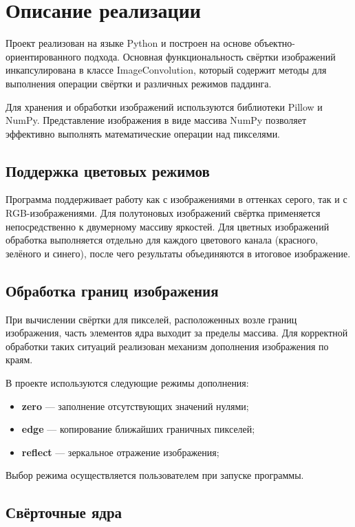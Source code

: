 \documentclass[a4paper]{article}
\begin{document}
\section{Описание реализации}

Проект реализован на языке Python и построен на основе объектно-ориентированного подхода. Основная функциональность свёртки изображений инкапсулирована в классе ImageConvolution, который содержит методы для выполнения операции свёртки и различных режимов паддинга.

Для хранения и обработки изображений используются библиотеки Pillow и NumPy. Представление изображения в виде массива NumPy позволяет эффективно выполнять математические операции над пикселями.

\subsection{Поддержка цветовых режимов}

Программа поддерживает работу как с изображениями в оттенках серого, так и с RGB-изображениями.
Для полутоновых изображений свёртка применяется непосредственно к двумерному массиву яркостей.
Для цветных изображений обработка выполняется отдельно для каждого цветового канала (красного, зелёного и синего), после чего результаты объединяются в итоговое изображение.

\subsection{Обработка границ изображения}

При вычислении свёртки для пикселей, расположенных возле границ изображения, часть элементов ядра выходит за пределы массива. Для корректной обработки таких ситуаций реализован механизм дополнения изображения по краям.

В проекте используются следующие режимы дополнения:
\begin{itemize}
    \item \textbf{zero} --- заполнение отсутствующих значений нулями;
    \item \textbf{edge} --- копирование ближайших граничных пикселей;
    \item \textbf{reflect} --- зеркальное отражение изображения;
\end{itemize}

Выбор режима осуществляется пользователем при запуске программы.

\subsection{Свёрточные ядра}
\end{document}
